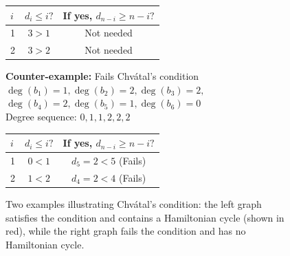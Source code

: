\documentclass{article}
\theoremstyle{definition}
\begin{document}
\begin{figure}[h!]
\begin{center}
\begin{minipage}{0.48\textwidth}
\begin{center}
\begin{tabular}{lcc}
\toprule
$i$ & $d_i \leq i?$ & If yes, $d_{n-i} \geq n-i?$ \\
\midrule
1 & $3 > 1$ & Not needed \\
2 & $3 > 2$ & Not needed \\
\bottomrule
\end{tabular}
\end{center}
\end{minipage}
\hfill
\begin{minipage}{0.48\textwidth}
\centering
{}

\begin{center}
\textbf{Counter-example:} Fails Chvátal's condition\\
\small $\deg(b_1) = 1, \deg(b_2) = 2, \deg(b_3) = 2,$\\
\small $\deg(b_4) = 2, \deg(b_5) = 1, \deg(b_6) = 0$\\
Degree sequence: $0,1,1,2,2,2$

\begin{tabular}{lcc}
\toprule
$i$ & $d_i \leq i?$ & If yes, $d_{n-i} \geq n-i?$ \\
\midrule
1 & $0 < 1$ & $d_5 = 2 < 5$ (Fails) \\
2 & $1 < 2$ & $d_4 = 2 < 4$ (Fails) \\
\bottomrule
\end{tabular}
\end{center}
\end{minipage}
\caption{Two examples illustrating Chvátal's condition: the left graph satisfies the condition and contains a Hamiltonian cycle (shown in red), while the right graph fails the condition and has no Hamiltonian cycle.}
\label{fig:chvatal-condition}
\end{center}
\end{figure}
\end{document}
